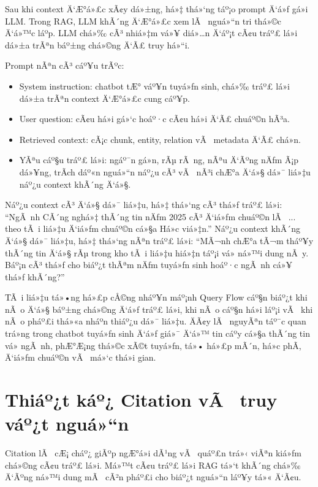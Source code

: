 ﻿\documentclass[12pt,a4paper]{report}
\begin{document}
Sau khi context Ä‘Æ°á»£c xÃ¢y dá»±ng, há»‡ thá»‘ng táº¡o prompt Ä‘á»ƒ gá»i LLM. Trong RAG, LLM khÃ´ng Ä‘Æ°á»£c xem lÃ  nguá»“n tri thá»©c Ä‘á»™c láº­p. LLM chá»‰ cÃ³ nhiá»‡m vá»¥ diá»…n Ä‘áº¡t cÃ¢u tráº£ lá»i dá»±a trÃªn báº±ng chá»©ng Ä‘Ã£ truy há»“i.

Prompt nÃªn cÃ³ cáº¥u trÃºc:

\begin{itemize}
    \item System instruction: chatbot tÆ° váº¥n tuyá»ƒn sinh, chá»‰ tráº£ lá»i dá»±a trÃªn context Ä‘Æ°á»£c cung cáº¥p.
    \item User question: cÃ¢u há»i gá»‘c hoáº·c cÃ¢u há»i Ä‘Ã£ chuáº©n hÃ³a.
    \item Retrieved context: cÃ¡c chunk, entity, relation vÃ  metadata Ä‘Ã£ chá»n.
    \item YÃªu cáº§u tráº£ lá»i: ngáº¯n gá»n, rÃµ rÃ ng, nÃªu Ä‘Ãºng nÄƒm Ã¡p dá»¥ng, trÃ­ch dáº«n nguá»“n náº¿u cÃ³ vÃ  nÃ³i chÆ°a Ä‘á»§ dá»¯ liá»‡u náº¿u context khÃ´ng Ä‘á»§.
\end{itemize}

Náº¿u context cÃ³ Ä‘á»§ dá»¯ liá»‡u, há»‡ thá»‘ng cÃ³ thá»ƒ tráº£ lá»i: ``NgÃ nh CÃ´ng nghá»‡ thÃ´ng tin nÄƒm 2025 cÃ³ Ä‘iá»ƒm chuáº©n lÃ  ... theo tÃ i liá»‡u Ä‘iá»ƒm chuáº©n cá»§a Há»c viá»‡n.'' Náº¿u context khÃ´ng Ä‘á»§ dá»¯ liá»‡u, há»‡ thá»‘ng nÃªn tráº£ lá»i: ``MÃ¬nh chÆ°a tÃ¬m tháº¥y thÃ´ng tin Ä‘á»§ rÃµ trong kho tÃ i liá»‡u hiá»‡n táº¡i vá» ná»™i dung nÃ y. Báº¡n cÃ³ thá»ƒ cho biáº¿t thÃªm nÄƒm tuyá»ƒn sinh hoáº·c ngÃ nh cá»¥ thá»ƒ khÃ´ng?''

TÃ i liá»‡u tá»•ng há»£p cÅ©ng nháº¥n máº¡nh Query Flow cáº§n biáº¿t khi nÃ o Ä‘á»§ báº±ng chá»©ng Ä‘á»ƒ tráº£ lá»i, khi nÃ o cáº§n há»i láº¡i vÃ  khi nÃ o pháº£i thá»«a nháº­n thiáº¿u dá»¯ liá»‡u. ÄÃ¢y lÃ  nguyÃªn táº¯c quan trá»ng trong chatbot tuyá»ƒn sinh Ä‘á»ƒ giá»¯ Ä‘á»™ tin cáº­y cá»§a thÃ´ng tin vá» ngÃ nh, phÆ°Æ¡ng thá»©c xÃ©t tuyá»ƒn, tá»• há»£p mÃ´n, há»c phÃ­, Ä‘iá»ƒm chuáº©n vÃ  má»‘c thá»i gian.

\section{Thiáº¿t káº¿ Citation vÃ  truy váº¿t nguá»“n}

Citation lÃ  cÆ¡ cháº¿ giÃºp ngÆ°á»i dÃ¹ng vÃ  quáº£n trá»‹ viÃªn kiá»ƒm chá»©ng cÃ¢u tráº£ lá»i. Má»™t cÃ¢u tráº£ lá»i RAG tá»‘t khÃ´ng chá»‰ Ä‘Ãºng ná»™i dung mÃ  cÃ²n pháº£i cho biáº¿t nguá»“n láº¥y tá»« Ä‘Ã¢u.
\end{document}
